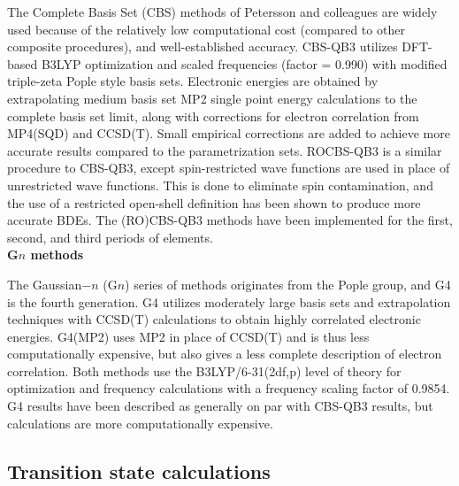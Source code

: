 The Complete Basis Set (CBS) methods of Petersson and
colleagues\cite{Montgomery1999, Montgomery2000, Ochterski1996, Wood2006} are
widely used because of the relatively low computational cost (compared to other
composite procedures), and well-established accuracy.\cite{Somers2015,
Simmie2015} CBS-QB3\cite{Montgomery1999, Montgomery2000} utilizes DFT-based
B3LYP optimization and scaled frequencies (factor = 0.990) with modified
triple-zeta Pople style basis sets. Electronic energies are obtained by
extrapolating medium basis set MP2 single point energy calculations to the
complete basis set limit, along with corrections for electron correlation from
MP4(SQD) and CCSD(T). Small empirical corrections are added to achieve more
accurate results compared to the parametrization sets.\cite{Petersson2001}
ROCBS-QB3 is a similar procedure to CBS-QB3, except spin-restricted wave
functions are used in place of unrestricted wave functions. This is done to
eliminate spin contamination, and the use of a restricted open-shell definition
has been shown to produce more accurate BDEs.\cite{DiLabio1999} The (RO)CBS-QB3
methods have been implemented for the first, second, and third periods of
elements. \\

\noindent \textbf{G$n$ methods}

The Gaussian$-n$ (G$n$) series of methods originates from the Pople
group,\cite{Pople1989} and G4 is the fourth generation. G4 utilizes moderately
large basis sets and extrapolation techniques with CCSD(T) calculations to
obtain highly correlated electronic energies. G4(MP2) uses MP2 in place of
CCSD(T) and is thus less computationally expensive, but also gives a less
complete description of electron correlation. Both methods use the
B3LYP/6-31(2df,p) level of theory for optimization and frequency calculations
with a frequency scaling factor of 0.9854. G4 results have been described as
generally on par with CBS-QB3 results,\cite{Somers2015, Simmie2015} but
calculations are more computationally expensive.

\subsection{Transition state calculations}

